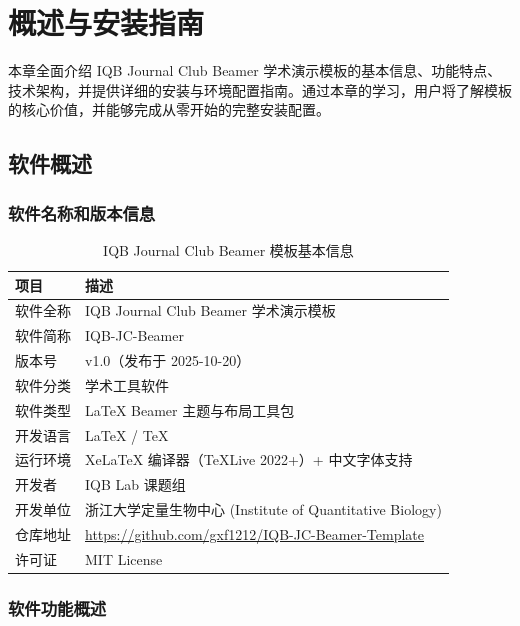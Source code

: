 
\chapter{概述与安装指南}
\label{chap:1}

本章全面介绍 IQB Journal Club Beamer 学术演示模板的基本信息、功能特点、技术架构，并提供详细的安装与环境配置指南。通过本章的学习，用户将了解模板的核心价值，并能够完成从零开始的完整安装配置。

\section{软件概述}

\subsection{软件名称和版本信息}

\begin{table}[h]
\centering
\caption{IQB Journal Club Beamer 模板基本信息}
\label{tab:basic-info}
\begin{tabular}{p{3.5cm}p{9.5cm}}
\toprule
\textbf{项目} & \textbf{描述} \\
\midrule
软件全称 & IQB Journal Club Beamer 学术演示模板 \\
软件简称 & IQB-JC-Beamer \\
版本号 & v1.0（发布于 2025-10-20） \\
软件分类 & 学术工具软件 \\
软件类型 & LaTeX Beamer 主题与布局工具包 \\
开发语言 & LaTeX / TeX \\
运行环境 & XeLaTeX 编译器（TeXLive 2022+）+ 中文字体支持 \\
开发者 & IQB Lab 课题组 \\
开发单位 & 浙江大学定量生物中心 (Institute of Quantitative Biology) \\
仓库地址 & \href{https://github.com/gxf1212/IQB-JC-Beamer-Template}{https://github.com/gxf1212/IQB-JC-Beamer-Template} \\
许可证 & MIT License \\
\bottomrule
\end{tabular}
\end{table}

\subsection{软件功能概述}

